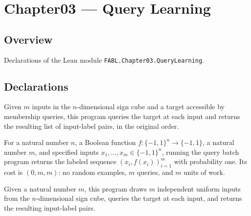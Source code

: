 \chapter{Chapter03 — Query Learning}
\section{Overview}

Declarations of the Lean module \texttt{FABL.Chapter03.QueryLearning}.

\section{Declarations}

\begin{definition}
\label{FABL.queryInputBatchProgram}
\leanok
{}
Given $m$ inputs in the $n$-dimensional sign cube and a target accessible by membership
queries, this program queries the target at each input and returns the resulting list of
input-label pairs, in the original order.
\end{definition}

\begin{theorem}
\label{FABL.runWithCost_queryInputBatchProgram}
\leanok
{}
For a natural number $n$, a Boolean function $f:\{−1,1\}^n\to\{−1,1\}$, a natural number
$m$, and specified inputs $x_1,\ldots,x_m\in\{−1,1\}^n$, running the query batch program
returns the labeled sequence $(x_i,f(x_i))_{i=1}^m$ with probability one. Its cost is
$(0,m,m)$: no random examples, $m$ queries, and $m$ units of work.
\end{theorem}

\begin{definition}
\label{FABL.queriedRandomExampleBatchProgram}
\leanok
{}
Given a natural number $m$, this program draws $m$ independent uniform inputs from the
$n$-dimensional sign cube, queries the target at each input, and returns the resulting
input-label pairs.
\end{definition}

